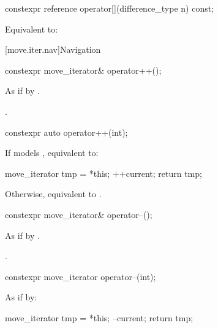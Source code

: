 %
\begin{itemdecl}
constexpr reference operator[](difference_type n) const;
\end{itemdecl}

\begin{itemdescr}
\pnum
\effects
Equivalent to: 
\end{itemdescr}

[move.iter.nav]{Navigation}

%
\begin{itemdecl}
constexpr move_iterator& operator++();
\end{itemdecl}

\begin{itemdescr}
\pnum
\effects
As if by .

\pnum
\returns
{}.
\end{itemdescr}

%
\begin{itemdecl}
constexpr auto operator++(int);
\end{itemdecl}

\begin{itemdescr}
\pnum
\effects
If  models , equivalent to:
\begin{codeblock}
move_iterator tmp = *this;
++current;
return tmp;
\end{codeblock}
Otherwise, equivalent to .
\end{itemdescr}

%
\begin{itemdecl}
constexpr move_iterator& operator--();
\end{itemdecl}

\begin{itemdescr}
\pnum
\effects
As if by .

\pnum
\returns
{}.
\end{itemdescr}

%
\begin{itemdecl}
constexpr move_iterator operator--(int);
\end{itemdecl}

\begin{itemdescr}
\pnum
\effects
As if by:
\begin{codeblock}
move_iterator tmp = *this;
--current;
return tmp;
\end{codeblock}
\end{itemdescr}

